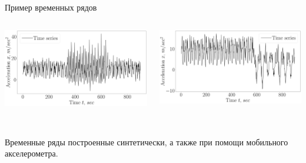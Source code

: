 \documentclass[10pt,pdf,hyperref={unicode}]{beamer}
\begin{document}
\begin{frame}[shrink=5]{Пример временных рядов}
\begin{columns}
    \begin{column}{0.5\textwidth}
        \includegraphics[width=1\textwidth]{results/real_1_series}
    \end{column}
    \begin{column}{0.5\textwidth}
        \includegraphics[width=1\textwidth]{results/real_2_series}
    \end{column}
\end{columns}

~\\
Временные ряды построенные синтетически, а также при помощи мобильного акселерометра.

\end{frame}
\end{document}
